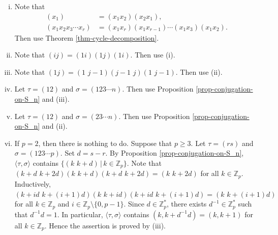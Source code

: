\begin{sketch}
	\begin{enumerate}[(i)]
		\item Note that 
		\begin{align*}
			(x_1) &= (x_1x_2)(x_2x_1),
			\\
			(x_1x_2x_3\cdots x_r) &= (x_1x_r)(x_1x_{r-1})\cdots (x_1x_3)(x_1x_2).
		\end{align*} Then use Theorem \ref{thm-cycle-decomposition}.
		\item Note that $(ij) = (1i)(1j)(1i)$. Then use (i).
		\item Note that $(1j) = (1\,\, j-1)(j-1\,\, j)(1\,\, j-1)$. Then use (ii).
		\item Let $\tau = (12)$ and $\sigma = (123\cdots n)$. Then use Proposition \ref{prop-conjugation-on-S_n} and (iii).
		\item Let $\tau = (12)$ and $\sigma = (23\cdots n)$. Then use Proposition \ref{prop-conjugation-on-S_n} and (ii).
		\item If $p=2$, then there is nothing to do. Suppose that $p\geq 3$. Let $\tau = (rs)$ and $\sigma = (123\cdots p)$. Set $d = s-r$. By Proposition \ref{prop-conjugation-on-S_n}, $\langle \tau,  \sigma\rangle$ contains $\{(k\,\, k+d)\,|\,k\in\mathbb{Z}_p\}$.  Note that $(k+d\,\, k+2d)(k\,\, k+d)(k+d\,\, k+2d) = (k\,\, k+2d)$ for all $k\in \mathbb{Z}_p$. Inductively, $(k+id\,\, k+(i+1)d)(k\,\, k+id)(k+id\,\, k+(i+1)d) = (k\,\, k+(i+1)d)$ for all $k\in\mathbb{Z}_p$ and $i\in \mathbb{Z}_p\setminus\{0,p-1\}$. Since $d\in \mathbb{Z}_p^*$, there exists $d^{-1}\in \mathbb{Z}_p^*$ such that $d^{-1}d = 1$. In particular, $\langle \tau,  \sigma\rangle$ contains $(k,k+d^{-1}d) = (k,k+1)$ for all $k\in\mathbb{Z}_p$. Hence the assertion is proved by (iii). \qedhere
	\end{enumerate}
\end{sketch}

